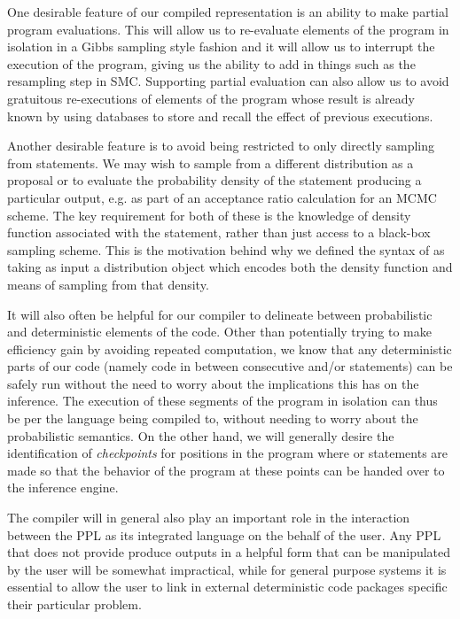 One desirable feature of our compiled representation is an ability to make partial
program evaluations.  This will allow us to re-evaluate elements of the program in
isolation in a Gibbs sampling style fashion and it will allow us to interrupt the execution
of the program, giving us the ability to add in things such as the resampling step in SMC.
Supporting partial evaluation can also allow us to avoid gratuitous re-executions of
elements of the program whose result is already known by using databases to store and
recall the effect of previous executions.

Another desirable feature is to avoid being restricted to only directly sampling from \sample
statements.  We may wish to sample from a different distribution as a proposal or to evaluate
the probability density of the \sample statement producing a particular output, e.g. as part
of an acceptance ratio calculation for an MCMC scheme.  The key requirement for both of these
is the knowledge of density function associated with the \sample statement, rather than
just access to a black-box sampling scheme.  This is the motivation behind why we defined
the syntax of \sample as taking as input a distribution object which encodes both the density
function and means of sampling from that density.

It will also often be helpful for our compiler to delineate between probabilistic and deterministic
elements of the code.  Other than potentially trying to make efficiency gain by avoiding
repeated computation, we know that any deterministic parts of our code (namely code in between
consecutive \sample and/or \observe statements) can be safely run without the need
to worry about the implications this has on the inference.  The execution of these segments of
the program in isolation can thus be per the language being compiled to, without needing to
worry about the probabilistic semantics.  On the other hand, we will generally desire the identification
of \emph{checkpoints} for positions in the program where \sample or \observe statements are
made so that the behavior of the program at these points can be handed over to the inference
engine.

The compiler will in general also play an important role in the interaction between the PPL
as its integrated language on the behalf of the user.  Any PPL that does not provide produce
outputs in a helpful form that can be manipulated by the user will be somewhat impractical,
while for general purpose systems it is essential to allow the user to link in external 
deterministic code packages specific their particular problem.

